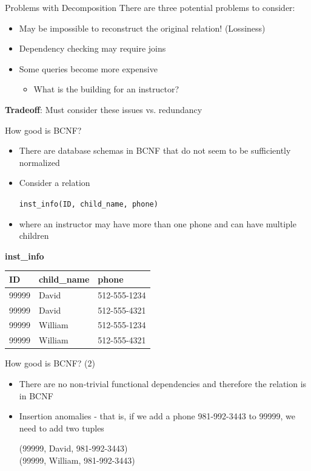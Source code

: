 \documentclass[aspectratio=169, xcolor=dvipsnames]{beamer}
\begin{document}
\begin{frame}{Problems with Decomposition}
    There are three potential problems to consider:
    \begin{itemize}[<+->]
        \item May be impossible to reconstruct the original relation! (Lossiness)
        \item Dependency checking may require joins
        \item Some queries become more expensive
        \begin{itemize}
            \item[$\triangleright$] What is the building for an instructor?
        \end{itemize}
    \end{itemize}
    \vspace{1em}
    \textbf{Tradeoff}: Must consider these issues vs. redundancy
\end{frame}

\begin{frame}{How good is BCNF?}
    \begin{itemize}[<+->]
        \item There are database schemas in BCNF that do not seem to be sufficiently normalized
        \item Consider a relation
        \begin{center}
        \texttt{inst\_info(ID, child\_name, phone)}
        \end{center}
        \item where an instructor may have more than one phone and can have multiple children
    \end{itemize}
    \textbf{inst\_info}
    \begin{center}
    \begin{tabular}{|l|l|l|}
    \hline
    \textbf{ID} & \textbf{child\_name} & \textbf{phone} \\ \hline
    99999 & David & 512-555-1234 \\ 
    99999 & David & 512-555-4321 \\ 
    99999 & William & 512-555-1234 \\ 
    99999 & William & 512-555-4321 \\ \hline
    \end{tabular}
    \end{center}
\end{frame}

\begin{frame}{How good is BCNF? (2)}
    \begin{itemize}[<+->]
        \item There are no non-trivial functional dependencies and therefore the relation is in BCNF
        \item Insertion anomalies - that is, if we add a phone 981-992-3443 to 99999, we need to add two tuples
        \begin{center}
        (99999, David, 981-992-3443) \\
        (99999, William, 981-992-3443)
        \end{center}
    \end{itemize}
\end{frame}
\end{document}
